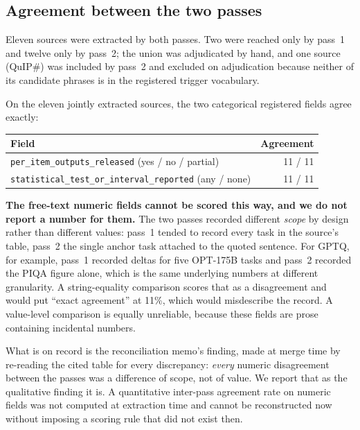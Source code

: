 \subsection{Agreement between the two passes}

Eleven sources were extracted by both passes. Two were reached only by pass~1
and twelve only by pass~2; the union was adjudicated by hand, and one source
(QuIP\#) was included by pass~2 and excluded on adjudication because neither of
its candidate phrases is in the registered trigger vocabulary.

On the eleven jointly extracted sources, the two categorical registered fields
agree exactly:

\begin{tabular}{@{}lr@{}}
\toprule
Field & Agreement \\
\midrule
\texttt{per\_item\_outputs\_released} (yes / no / partial) & 11 / 11 \\
\texttt{statistical\_\allowbreak{}test\_\allowbreak{}or\_\allowbreak{}interval\_\allowbreak{}reported} (any / none) & 11 / 11 \\
\bottomrule
\end{tabular}

\medskip
\noindent
\textbf{The free-text numeric fields cannot be scored this way, and we do not
report a number for them.} The two passes recorded different \emph{scope} by
design rather than different values: pass~1 tended to record every task in the
source's table, pass~2 the single anchor task attached to the quoted sentence.
For GPTQ, for example, pass~1 recorded deltas for five OPT-175B tasks and
pass~2 recorded the PIQA figure alone, which is the same underlying numbers at
different granularity. A string-equality comparison scores that as a disagreement and
would put ``exact agreement'' at 11\%, which would misdescribe the record. A
value-level comparison is equally unreliable, because these fields are prose
containing incidental numbers.

What is on record is the reconciliation memo's finding, made at merge time by
re-reading the cited table for every discrepancy: \emph{every} numeric
disagreement between the passes was a difference of scope, not of value. We
report that as the qualitative finding it is. A quantitative inter-pass
agreement rate on numeric fields was not computed at extraction time and cannot
be reconstructed now without imposing a scoring rule that did not exist then.

